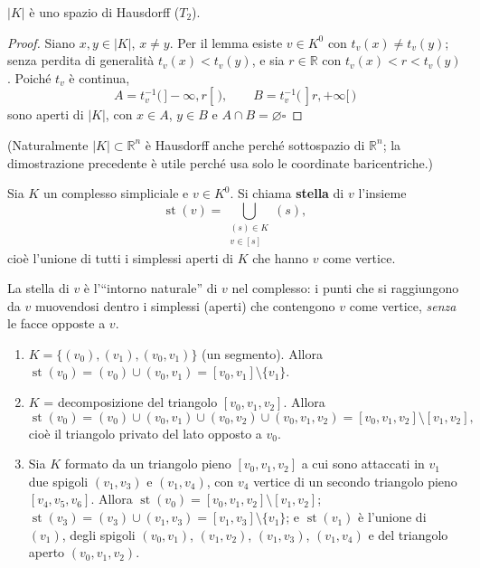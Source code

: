 \begin{prop}
$|K|$ \`e uno spazio di Hausdorff ($T_2$).
\end{prop}
\begin{proof}
Siano $x, y \in |K|$, $x \neq y$. Per il lemma esiste $v \in K^0$ con $t_v(x) \neq t_v(y)$; senza perdita di generalit\`a $t_v(x) < t_v(y)$, e sia $r \in \mathbb{R}$ con $t_v(x) < r < t_v(y)$. Poich\'e $t_v$ \`e continua,
\[
A = t_v^{-1}\big(\,]-\infty, r[\,\big), \qquad B = t_v^{-1}\big(\,]r, +\infty[\,\big)
\]
sono aperti di $|K|$, con $x \in A$, $y \in B$ e $A \cap B = \varnothing$\hfill$\square$
\end{proof}

(Naturalmente $|K| \subset \mathbb{R}^n$ \`e Hausdorff anche perch\'e sottospazio di $\mathbb{R}^n$; la dimostrazione precedente \`e utile perch\'e usa solo le coordinate baricentriche.)

\begin{definicion}
Sia $K$ un complesso simpliciale e $v \in K^0$. Si chiama \textbf{stella} di $v$ l'insieme
\[
\operatorname{st}(v) = \bigcup_{\substack{(s) \in K \\ v \in [s]}} (s),
\]
cio\`e l'unione di tutti i simplessi aperti di $K$ che hanno $v$ come vertice.
\end{definicion}

\begin{intuizione}
La stella di $v$ \`e l'``intorno naturale'' di $v$ nel complesso: i punti che si raggiungono da $v$ muovendosi dentro i simplessi (aperti) che contengono $v$ come vertice, \emph{senza} le facce opposte a $v$.
\end{intuizione}

\begin{ejemplo}
\begin{enumerate}
    \item $K = \{ (v_0), (v_1), (v_0, v_1) \}$ (un segmento). Allora $\operatorname{st}(v_0) = (v_0) \cup (v_0, v_1) = [v_0, v_1] \setminus \{v_1\}$.
    \item $K$ = decomposizione del triangolo $[v_0, v_1, v_2]$. Allora
    \[
    \operatorname{st}(v_0) = (v_0) \cup (v_0, v_1) \cup (v_0, v_2) \cup (v_0, v_1, v_2) = [v_0, v_1, v_2] \setminus [v_1, v_2],
    \]
    cio\`e il triangolo privato del lato opposto a $v_0$.
    \item Sia $K$ formato da un triangolo pieno $[v_0, v_1, v_2]$ a cui sono attaccati in $v_1$ due spigoli $(v_1, v_3)$ e $(v_1, v_4)$, con $v_4$ vertice di un secondo triangolo pieno $[v_4, v_5, v_6]$. Allora $\operatorname{st}(v_0) = [v_0, v_1, v_2] \setminus [v_1, v_2]$; $\operatorname{st}(v_3) = (v_3) \cup (v_1, v_3) = [v_1, v_3] \setminus \{v_1\}$; e $\operatorname{st}(v_1)$ \`e l'unione di $(v_1)$, degli spigoli $(v_0,v_1)$, $(v_1,v_2)$, $(v_1, v_3)$, $(v_1, v_4)$ e del triangolo aperto $(v_0, v_1, v_2)$.
\end{enumerate}
\end{ejemplo}

